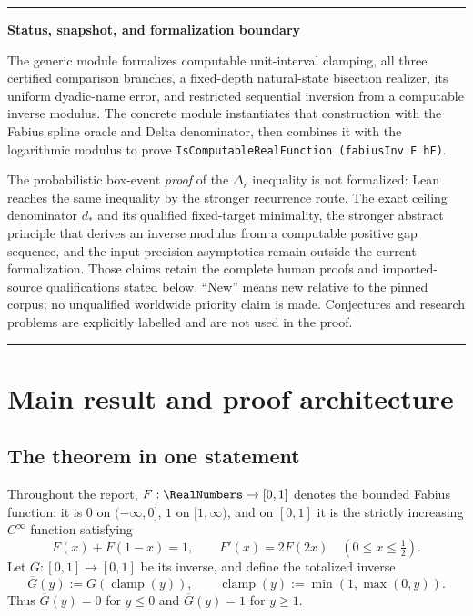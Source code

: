 \documentclass[11pt,oneside]{article}
\theoremstyle{definition}
\theoremstyle{remark}
\numberwithin{equation}{section}
\newcommand{\InvT}{\overline G}
\newcommand{\Clamp}{\operatorname{clamp}}
\newenvironment{statusbox}[1]{%
  \par\smallskip\noindent\begin{center}\begin{minipage}{0.94\textwidth}%
  \color{black}\hrule\vspace{0.55em}\small\noindent\textbf{#1}\par\smallskip
}{%
  \vspace{0.55em}\hrule\end{minipage}\end{center}\smallskip
}
\begin{document}
\begin{statusbox}{Status, snapshot, and formalization boundary}
The generic module
formalizes computable unit-interval clamping, all three certified comparison
branches, a fixed-depth natural-state bisection realizer, its uniform
dyadic-name error, and restricted sequential inversion from a computable
inverse modulus.  The concrete module
instantiates that construction with the Fabius spline oracle and Delta
denominator, then combines it with the logarithmic modulus to prove
\texttt{IsComputableRealFunction (fabiusInv F hF)}.

The probabilistic box-event \emph{proof} of the $\Delta_r$ inequality is not
formalized: Lean reaches the same inequality by the stronger recurrence
route.  The exact ceiling denominator $d_*$ and its qualified fixed-target
minimality, the stronger abstract principle that derives an inverse modulus
from a computable positive gap sequence, and the input-precision asymptotics remain
outside the current formalization.  Those claims retain the complete human
proofs and imported-source qualifications stated below.  ``New'' means new
relative to the pinned corpus; no unqualified worldwide priority claim is
made.  Conjectures and research problems are explicitly labelled and are not
used in the proof.
\end{statusbox}

\tableofcontents
\clearpage

\section{Main result and proof architecture}

\subsection{The theorem in one statement}

Throughout the report, $F:\RealNumbers\to[0,1]$ denotes the bounded Fabius function:
it is $0$ on $(-\infty,0]$, $1$ on $[1,\infty)$, and on $[0,1]$ it is the
strictly increasing $C^\infty$ function satisfying
\begin{equation}\label{eq:F-basic}
 F(x)+F(1-x)=1,
 \qquad
 F'(x)=2F(2x)\quad(0\le x\le\tfrac12).
\end{equation}
Let $G:[0,1]\to[0,1]$ be its inverse, and define the totalized inverse
\begin{equation}\label{eq:totalized-inverse}
 \InvT(y):=G(\Clamp(y)),
 \qquad
 \Clamp(y):=\min(1,\max(0,y)).
\end{equation}
Thus $\InvT(y)=0$ for $y\le0$ and $\InvT(y)=1$ for $y\ge1$.
\end{document}
